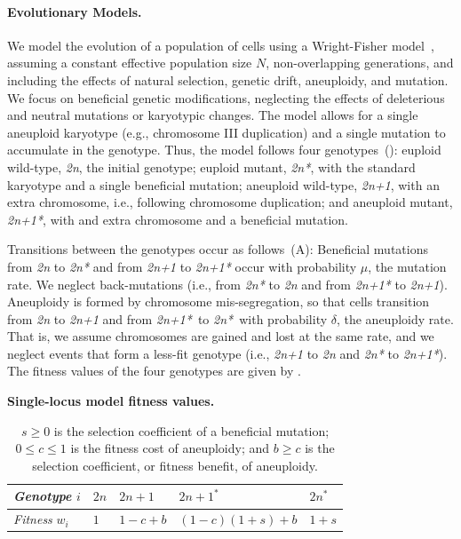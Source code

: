 \documentclass[12pt]{extarticle}
\newcommand{\euwt}{\emph{2n}}
\newcommand{\anwt}{\emph{2n+1}}
\newcommand{\eumt}{\emph{2n*}}
\newcommand{\anmt}{\emph{2n+1*}}
\begin{document}
\paragraph*{Evolutionary Models.}
We model the evolution of a population of cells using a Wright-Fisher model~\citep{Otto2007}, assuming a constant effective population size $N$, non-overlapping generations, and including the effects of natural selection, genetic drift, aneuploidy, and mutation. 
We focus on beneficial genetic modifications, neglecting the effects of deleterious and neutral mutations or karyotypic changes.
The model allows for a single aneuploid karyotype (e.g., chromosome III duplication) and a single mutation to accumulate in the genotype.
Thus, the model follows four genotypes~(): euploid wild-type, \euwt, the initial genotype; 
euploid mutant, \eumt, with the standard karyotype and a single beneficial mutation; 
aneuploid wild-type, \anwt, with an extra chromosome, i.e., following chromosome duplication; and
aneuploid mutant, \anmt, with and extra chromosome and a beneficial mutation. 

Transitions between the genotypes occur as follows~(A): Beneficial mutations from \euwt\; to \eumt\; and from \anwt\; to \anmt\; occur with probability $\mu$, the mutation rate. We neglect back-mutations (i.e., from \eumt\; to \euwt\; and from \anmt\; to \anwt).
Aneuploidy is formed by chromosome mis-segregation, so that cells transition from \euwt\; to \anwt\; and from \anmt\ to \eumt\ with probability $\delta$, the aneuploidy rate. That is, we assume chromosomes are gained and lost at the same rate, and we neglect events that form a less-fit genotype (i.e., \anwt\; to \euwt\; and \eumt\; to \anmt).
The fitness values of the four genotypes are given by .

\begin{table}[h]
\centering
\caption{\textbf{Single-locus model fitness values.}}
\begin{tabular}{lllll}
\emph{Genotype} $i$ & $2n$ & $2n+1$ & $2n+1^*$ & $2n^*$ \\
\hline
\emph{Fitness} $w_i$ & $1$ & $1-c+b$ & $(1-c)(1+s)+b$ & $1+s$               
\end{tabular}
\label{table:single-locus}
\caption*{
$s \ge 0$ is the selection coefficient of a beneficial mutation;
$0 \le c \le 1$ is the fitness cost of aneuploidy;
and $b \ge c$ is the selection coefficient, or fitness benefit, of aneuploidy.
}
\end{table}
\end{document}
